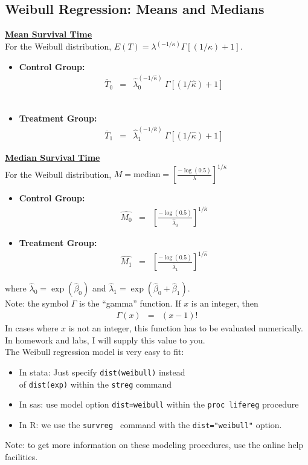 \documentclass[11pt,psfig]{book}
\begin{document}
\subsection{Weibull Regression: Means and Medians}
\underline{\bf Mean Survival Time}\\[1ex]
For the Weibull distribution, $E(T)=\lambda^{(-1/\kappa)}
\Gamma[(1/\kappa) + 1]$.
\begin{itemize}
\item {\bf Control Group:}
\begin{eqnarray*}
\overline{T}_0 & = & \hat\lambda_0^{(-1/\hat\kappa)}~\Gamma[(1/\hat\kappa) + 1]
\end{eqnarray*}
\\[2ex]
\item {\bf Treatment Group:}
\begin{eqnarray*}
\overline{T}_1 & = & \hat\lambda_1^{(-1/\hat\kappa)}~\Gamma[(1/\hat\kappa) + 1]
\end{eqnarray*}
\end{itemize}
\underline{\bf Median Survival Time}\\[1ex]
For the Weibull distribution,
 $M = \mbox{median} = \left[\frac{-\log(0.5)}{\lambda}\right]^{1/\kappa}$
\begin{itemize}
\item {\bf Control Group:}
\begin{eqnarray*}
\hat{M_0} & = & \left[\frac{-\log(0.5)}{\hat\lambda_0}\right]^{1/\hat\kappa}
\end{eqnarray*}
\item {\bf Treatment Group:}
\begin{eqnarray*}
\hat{M_1} & = & \left[\frac{-\log(0.5)}{\hat\lambda_1}\right]^{1/\hat\kappa}
\end{eqnarray*}
\end{itemize}
where $\hat\lambda_0=\exp(\hat\beta_0)$ and
$\hat\lambda_1=\exp(\hat\beta_0+\hat\beta_1)$.
\\[2ex]
Note:  the symbol $\Gamma$ is the ``gamma'' function.  If $x$ is an
integer, then
\begin{eqnarray*}
\Gamma(x) & = & (x-1)!
\end{eqnarray*}
In cases where $x$ is not an integer, this function has to be
evaluated numerically.  In homework and labs, I will supply this value
to you.
\\[2ex]
The Weibull regression model is very easy to fit:
\begin{itemize}
\item In {\sc stata}:  Just specify {\tt dist(weibull)} instead \\
of {\tt dist(exp)} within the {\tt streg} command
\item In {\sc sas}: use model option {\tt dist=weibull} within the
{\tt proc lifereg} procedure
\item In {\sc R}: we use the {\tt survreg } command with the {\tt dist="weibull"} option.
\end{itemize}
Note: to get more information on these modeling procedures, use the
online help facilities. 
\end{document}
